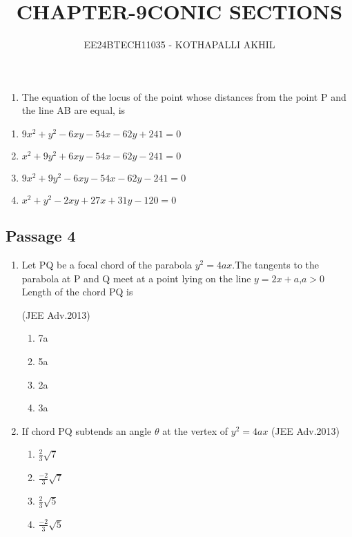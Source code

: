 \documentclass[journal,12pt,twocolumn]{IEEEtran}
\theoremstyle{remark}
\begin{document}

\vspace{3cm}
\title{CHAPTER-9}
\title{CONIC SECTIONS}
\author{EE24BTECH11035 - KOTHAPALLI AKHIL}
\maketitle
\newpage
\bigskip

\renewcommand{\thefigure}{\theenumi}
\renewcommand{\thetable}{\theenumi}
\begin{enumerate}
\item  The equation of the locus of the point whose distances from the point P and the line AB are equal, is
\end{enumerate}

\begin{enumerate}
     \item $9x^2+y^2-6xy-54x-62y+241=0$
     \item $x^2+9y^2+6xy-54x-62y-241=0$
     \item $9x^2+9y^2-6xy-54x-62y-241=0$
     \item $x^2+y^2-2xy+27x+31y-120=0$
\end{enumerate}
\subsection{Passage 4} 
\begin{enumerate}
\item Let PQ be a focal chord of the parabola $y^2=4ax$.The tangents to the parabola at P and Q meet at a point lying on the line $y=2x+a$,$a>0$
Length of the chord PQ is

\hfill(JEE Adv.2013)        
\begin{enumerate}
    \item 7a
    \item 5a
    \item 2a
    \item 3a
\end{enumerate}

\item If chord PQ subtends an angle $\theta$  at the vertex of $y^2=4ax$
\hfill(JEE Adv.2013)

\begin{enumerate}
    \item $\frac{2}{3}\sqrt{7}$
    
    \item $\frac{-2}{3}\sqrt{7}$
    
    \item $\frac{2}{3}\sqrt{5}$
    
    \item $\frac{-2}{3}\sqrt{5}$
\end{enumerate}
\end{enumerate}
\end{document}
